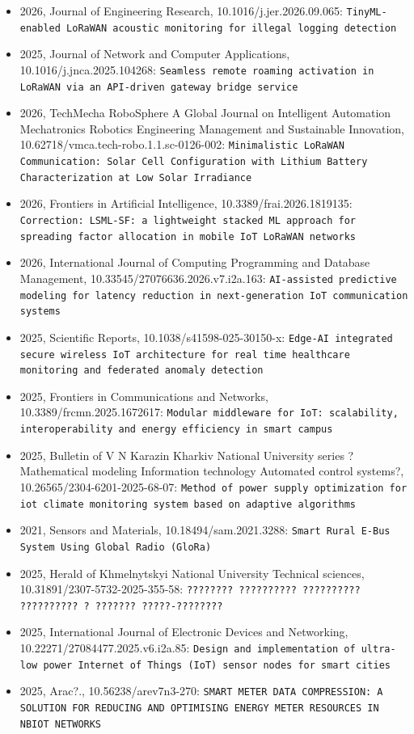 \begin{itemize}
\item 2026, Journal of Engineering Research, 10.1016/j.jer.2026.09.065: \texttt{TinyML-enabled LoRaWAN acoustic monitoring for illegal logging detection}
\item 2025, Journal of Network and Computer Applications, 10.1016/j.jnca.2025.104268: \texttt{Seamless remote roaming activation in LoRaWAN via an API-driven gateway bridge service}
\item 2026, TechMecha RoboSphere A Global Journal on Intelligent Automation Mechatronics Robotics Engineering Management and Sustainable Innovation, 10.62718/vmca.tech-robo.1.1.sc-0126-002: \texttt{Minimalistic LoRaWAN Communication: Solar Cell Configuration with Lithium Battery Characterization at Low Solar Irradiance}
\item 2026, Frontiers in Artificial Intelligence, 10.3389/frai.2026.1819135: \texttt{Correction: LSML-SF: a lightweight stacked ML approach for spreading factor allocation in mobile IoT LoRaWAN networks}
\item 2026, International Journal of Computing Programming and Database Management, 10.33545/27076636.2026.v7.i2a.163: \texttt{AI-assisted predictive modeling for latency reduction in next-generation IoT communication systems}
\item 2025, Scientific Reports, 10.1038/s41598-025-30150-x: \texttt{Edge-AI integrated secure wireless IoT architecture for real time healthcare monitoring and federated anomaly detection}
\item 2025, Frontiers in Communications and Networks, 10.3389/frcmn.2025.1672617: \texttt{Modular middleware for IoT: scalability, interoperability and energy efficiency in smart campus}
\item 2025, Bulletin of V N Karazin Kharkiv National University series ?Mathematical modeling Information technology Automated control systems?, 10.26565/2304-6201-2025-68-07: \texttt{Method of power supply optimization for iot climate monitoring system based on adaptive algorithms}
\item 2021, Sensors and Materials, 10.18494/sam.2021.3288: \texttt{Smart Rural E-Bus System Using Global Radio (GloRa)}
\item 2025, Herald of Khmelnytskyi National University Technical sciences, 10.31891/2307-5732-2025-355-58: \texttt{???????? ?????????? ?????????? ?????????? ? ??????? ?????-????????}
\item 2025, International Journal of Electronic Devices and Networking, 10.22271/27084477.2025.v6.i2a.85: \texttt{Design and implementation of ultra-low power Internet of Things (IoT) sensor nodes for smart cities}
\item 2025, Arac?., 10.56238/arev7n3-270: \texttt{SMART METER DATA COMPRESSION: A SOLUTION FOR REDUCING AND OPTIMISING ENERGY METER RESOURCES IN NBIOT NETWORKS}
\end{itemize}

